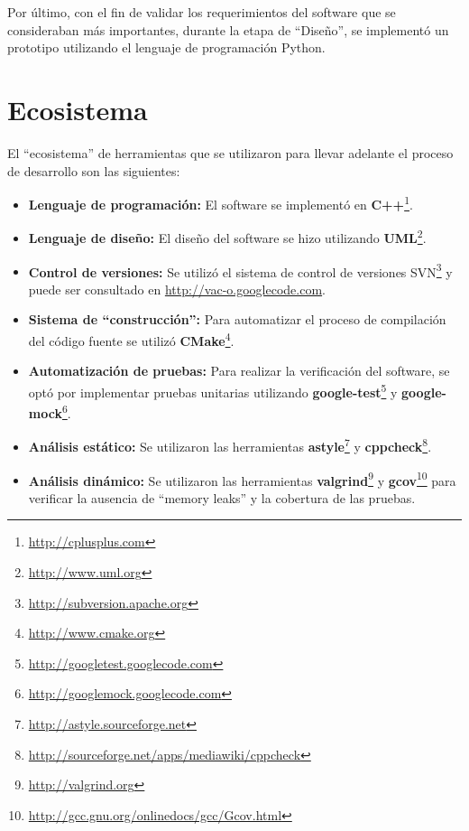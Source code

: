 Por \'ultimo, con el fin de validar los requerimientos del software que se
consideraban m\'as importantes, durante la etapa de ``Dise\~no'', se
implement\'o un prototipo utilizando el lenguaje de programaci\'on Python.

\section{Ecosistema}

El ``ecosistema'' de herramientas que se utilizaron para llevar adelante el
proceso de desarrollo son las siguientes:

\begin{itemize}
 \item \textbf{Lenguaje de programaci\'on:} El software se implement\'o en
\textbf{C++}\footnote{\url{http://cplusplus.com}}.
 \item \textbf{Lenguaje de dise\~no:} El dise\~no del software se hizo
utilizando \textbf{UML}\footnote{\url{http://www.uml.org}}.
 \item \textbf{Control de versiones:} Se utiliz\'o el sistema de control de
versiones \ac{SVN}\footnote{\url{http://subversion.apache.org}} y puede ser
consultado en \url{http://vac-o.googlecode.com}.
 \item \textbf{Sistema de ``construcci\'on'':} Para automatizar el
proceso de compilaci\'on del c\'odigo fuente se
utiliz\'o \textbf{CMake}\footnote{\url{http://www.cmake.org}}.
 \item \textbf{Automatizaci\'on de pruebas:} Para realizar la verificaci\'on del
software, se opt\'o por implementar pruebas unitarias utilizando
\textbf{google-test}\footnote{\url{http://googletest.googlecode.com}} y
\textbf{google-mock}\footnote{\url{http://googlemock.googlecode.com}}. 
 \item \textbf{An\'alisis est\'atico:} Se utilizaron las herramientas
\textbf{astyle}\footnote{\url{http://astyle.sourceforge.net}} y
\textbf{cppcheck}\footnote{
\url{http://sourceforge.net/apps/mediawiki/cppcheck}}.
 \item \textbf{An\'alisis din\'amico:} Se utilizaron las herramientas
\textbf{valgrind}\footnote{\url{http://valgrind.org}} y
\textbf{gcov}\footnote{\url{http://gcc.gnu.org/onlinedocs/gcc/Gcov.html}} para
verificar la ausencia de ``memory leaks'' y la cobertura de las pruebas.
\end{itemize}
